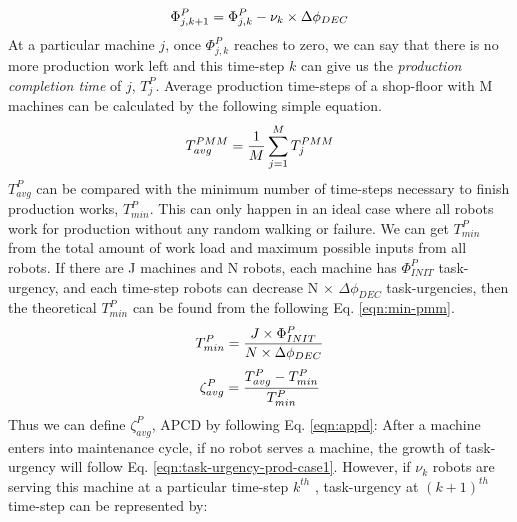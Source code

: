\documentclass[journal]{IEEEtran}
\begin{document}
\begin{equation}
\begin{small}
\Phi_{j, k+1}^{P} = \Phi_{j, k}^{P} - \nu_{k} \times \Delta \phi_{DEC}
\label{eqn:task-urgency-prod-case2}
\end{small}
\end{equation}
At a particular machine $j$, once $\Phi_{j, k}^{P}$ reaches to zero, we can say that there is no more production work left and this time-step $k$ can give us the {\em production completion time} of $j$, $T_{j}^{P}$. Average production time-steps of a shop-floor with M machines can be calculated by the following simple equation.
\begin{equation}
\begin{small}
T_{avg}^{PMM} = \frac{1}{M} \sum_{j=1}^{M} T_{j}^{PMM} 
\label{eqn:avg-pmm}
\end{small}
\end{equation}
$T_{avg}^{P}$ can be compared with the minimum number of time-steps necessary to finish production works, $T_{min}^{P}$. This can only happen in an ideal case where all robots work for production without any random walking or failure. We can get $T_{min}^{P}$ from the total amount of work load and maximum possible inputs from all robots. If there are J machines and N robots, each machine has $\Phi_{INIT}^{P}$ task-urgency, and each time-step robots can decrease N $\times$ $\Delta \phi_{DEC}$ task-urgencies, then the theoretical $T_{min}^{P}$ can be found from the following Eq. \ref{eqn:min-pmm}.
%
\begin{equation}
\begin{small}
T_{min}^{P} = \frac{J \times \Phi_{INIT}^{P}}{N \times \Delta \phi_{DEC}} 
\label{eqn:min-pmm}
\end{small}
\end{equation}
\begin{equation}
\begin{small}
\zeta_{avg}^{P} = \frac{T_{avg}^{P} - T_{min}^{P}}{T_{min}^{P}} 
\label{eqn:appd}
\end{small}
\end{equation}
Thus we can define $\zeta_{avg}^{P}$, \acf{APCD} by following Eq. \ref{eqn:appd}:
After a machine enters into maintenance cycle, if no robot serves a machine, the growth of task-urgency will follow Eq. \ref{eqn:task-urgency-prod-case1}. However, if $\nu_{k}$ robots are serving this machine at a particular time-step $k^{th}$ , task-urgency at $(k+1)^{th}$ time-step can be represented by:
\end{document}
